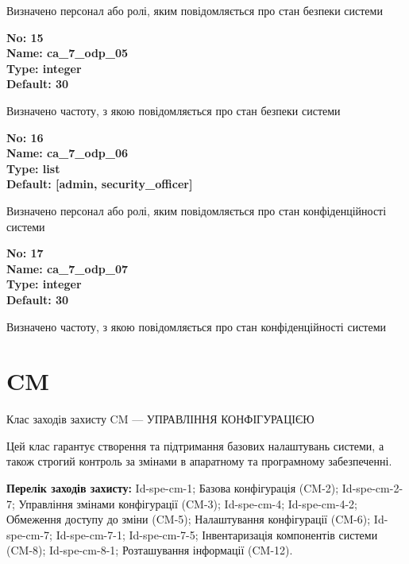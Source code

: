 \documentclass{article}
\begin{document}
{\footnotesize Визначено персонал або ролі, яким повідомляється про стан безпеки системи}


{\footnotesize\bfseries
No: 15\\
Name: ca\_\allowbreak{}7\_\allowbreak{}odp\_\allowbreak{}05\\
Type: integer\\
Default: 30
}

{\footnotesize Визначено частоту, з якою повідомляється про стан безпеки системи}


{\footnotesize\bfseries
No: 16\\
Name: ca\_\allowbreak{}7\_\allowbreak{}odp\_\allowbreak{}06\\
Type: list\\
Default: [\textquotedbl{}admin\textquotedbl{}, \textquotedbl{}security\_\allowbreak{}officer\textquotedbl{}]
}

{\footnotesize Визначено персонал або ролі, яким повідомляється про стан конфіденційності системи}


{\footnotesize\bfseries
No: 17\\
Name: ca\_\allowbreak{}7\_\allowbreak{}odp\_\allowbreak{}07\\
Type: integer\\
Default: 30
}

{\footnotesize Визначено частоту, з якою повідомляється про стан конфіденційності системи}




\section{CM}
Клас заходів захисту CM --- УПРАВЛІННЯ КОНФІГУРАЦІЄЮ

Цей клас гарантує створення та підтримання базових налаштувань системи, а також строгий контроль за змінами в апаратному та програмному забезпеченні.

\textbf{Перелік заходів захисту:} Id-spe-cm-1; Базова конфігурація (CM-2); Id-spe-cm-2-7; Управління змінами конфігурації (CM-3); Id-spe-cm-4; Id-spe-cm-4-2; Обмеження доступу до зміни (CM-5); Налаштування конфігурації (CM-6); Id-spe-cm-7; Id-spe-cm-7-1; Id-spe-cm-7-5; Інвентаризація компонентів системи (CM-8); Id-spe-cm-8-1; Розташування інформації (CM-12).
\end{document}
